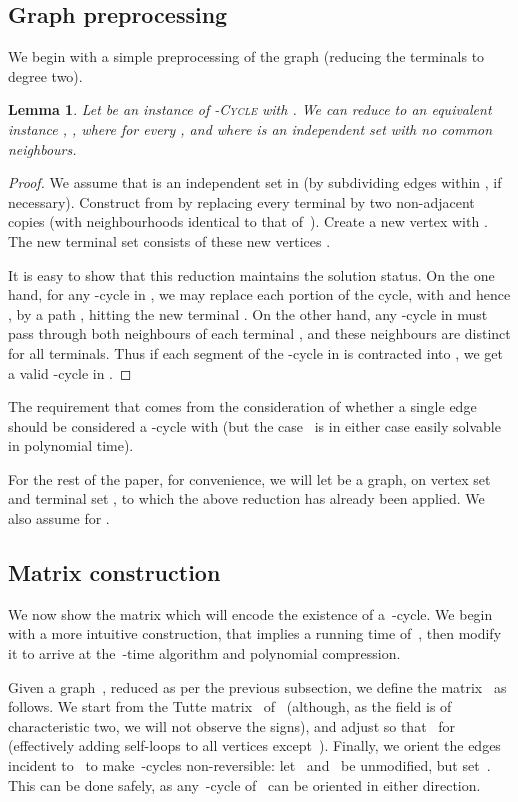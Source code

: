 \documentclass[a4paper,11pt]{article}
\newtheorem{lemma}{Lemma}
\begin{document}
\subsection{Graph preprocessing}

We begin with a simple preprocessing of the graph (reducing the terminals to degree two).

\begin{lemma}
\label{lemma:degtwo}
Let  be an instance of \textsc{-Cycle} with . We can reduce  to an
equivalent instance , , where  for every , and where
 is an independent set with no common neighbours.
\end{lemma}
\begin{proof}
We assume that  is an independent set in  (by subdividing edges within , 
if necessary). Construct  from  by replacing every terminal  by two
non-adjacent copies  (with neighbourhoods identical to that of~). Create
a new vertex  with . The new terminal set  consists of these new
vertices . 

It is easy to show that this reduction maintains the solution status. On the one hand, for
any -cycle in , we may replace each portion  of the cycle, with  and
hence , by a path , hitting the new terminal . On the
other hand, any -cycle in  must pass through both neighbours  of each
terminal , and these neighbours are distinct for all terminals. Thus if each
segment  of the -cycle in  is contracted into , we get a valid
-cycle in . 
\end{proof}

The requirement that  comes from the consideration of whether a single edge 
should be considered a -cycle with  (but the case~ is in either case
easily solvable in polynomial time).

For the rest of the paper, for convenience, we will let  be a graph, on vertex
set  and terminal set , to which the above
reduction has already been applied. We also assume  for
.

\subsection{Matrix construction}

We now show the matrix which will encode the existence of a~-cycle. We begin with a
more intuitive construction, that implies a running time of~, then modify it
to arrive at the~-time algorithm and polynomial compression. 

Given a graph~, reduced as per the previous subsection, we define the matrix~ as
follows. We start from the Tutte matrix~ of~ (although, as the field is of
characteristic two, we will not observe the signs), and adjust so that~
for~ (effectively adding self-loops to all vertices except~). Finally, we
orient the edges incident to~ to make~-cycles non-reversible: let~
and~ be unmodified, but set~. This can be done safely, as
any~-cycle of~ can be oriented in either direction. 
\end{document}
